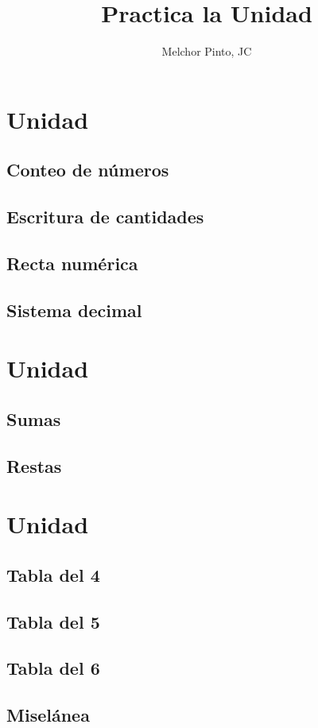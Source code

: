 \documentclass[12pt,addpoints,answers]{repaso}
\title{Practica la Unidad}
\author{Melchor Pinto, JC}
\begin{document}
\INFO%
\tableofcontents
\newpage
\begin{questions}\large
	\section{Unidad}

	\subsection{Conteo de números}
	\subsection{Escritura de cantidades}
	\subsection{Recta numérica}
	\subsection{Sistema decimal}

	\section{Unidad}

	\subsection{Sumas}
	\subsection{Restas}

	\section{Unidad}

	\subsection{Tabla del 4}
	\subsection{Tabla del 5}
	\subsection{Tabla del 6}
	\subsection{Miselánea}
	\questionboxed[10]{}
\end{questions}
\end{document}
